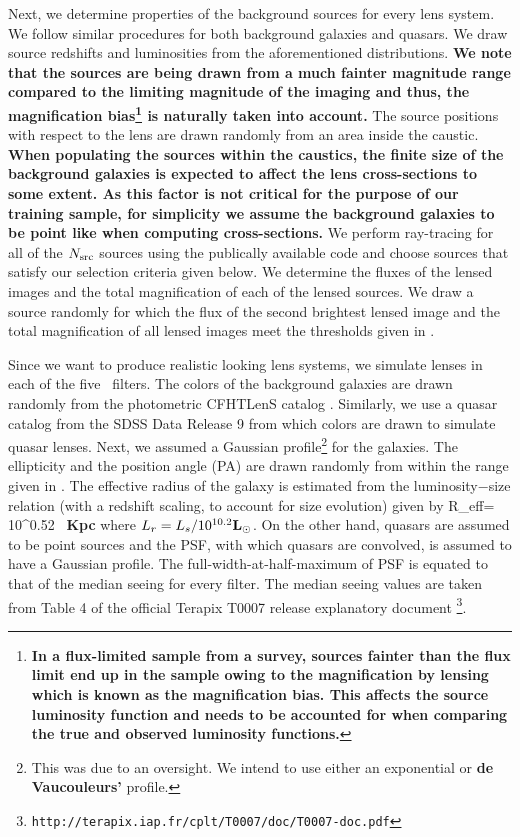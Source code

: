 \documentclass[useAMS,usenatbib,a4paper]{mn2e}
\begin{document}
Next, we determine properties of the background sources for every lens system.
We follow similar procedures for both background galaxies and quasars.
We draw source redshifts and luminosities from the aforementioned
distributions. {\bf We note that the sources are being drawn from a much
fainter magnitude range compared to the limiting magnitude of the
\cfhtls imaging and thus, the magnification bias\footnote{ {\bf In a
flux-limited sample from a survey, sources fainter than the flux limit
end up in the sample owing to the magnification by lensing which is
known as the magnification bias. This affects the source luminosity
function and needs to be accounted for when comparing the true and
observed luminosity functions.}} is naturally taken into account.} The
source positions with respect to the lens are drawn randomly from an
area inside the caustic.  {\bf When populating the sources within the
caustics, the finite size of the background galaxies is expected to
affect the lens cross-sections to some extent. As this factor is not
critical for the purpose of our training sample, for simplicity we assume the
background galaxies to be point like when computing cross-sections.} We perform
ray-tracing for all of the $N_{\rm src}$ sources using the publically
available code \gravlens \citep{Keeton2000} and choose sources that
satisfy our selection criteria given below. We determine the fluxes of the
lensed images and the total magnification of each of the lensed sources.
We draw a source randomly for which the flux of the second brightest
lensed image and the total magnification of all lensed images meet the
thresholds given in .

Since we want to produce realistic looking lens systems, we simulate
lenses in each of the five \cfhtls~filters. The colors of the background
galaxies are drawn randomly from the photometric CFHTLenS catalog
\citep{Hildebrandt2012,Erben2013}.  Similarly, we use a quasar catalog
from the SDSS Data Release 9 \citep{Paris2012} from which colors are
drawn to simulate quasar lenses. Next, we assumed a Gaussian
profile\footnote{This was due to an oversight. We intend to use either
an exponential or {\bf de Vaucouleurs'} profile.} for
the galaxies. The ellipticity and the position angle (PA) are drawn
randomly from within the range given in . The
effective radius of the galaxy is estimated from the luminosity$-$size
relation \citep{Bernardi2003} (with a redshift scaling, to account for
size evolution) given by
\be
R_{\rm eff}= 10^{0.52}  \, {\bf Kpc}
\ee
where $L_r=L_s/10^{10.2} {\bf L_\odot}$. On the other hand, quasars are assumed to be
point sources and the PSF, with which quasars are convolved, is assumed
to have a Gaussian profile. The full-width-at-half-maximum of PSF is
equated to that of the median seeing for every filter. The median seeing
values are taken from Table 4 of the official Terapix T0007 release
explanatory document \footnote{
\texttt{http://terapix.iap.fr/cplt/T0007/doc/T0007-doc.pdf}}.
\end{document}
